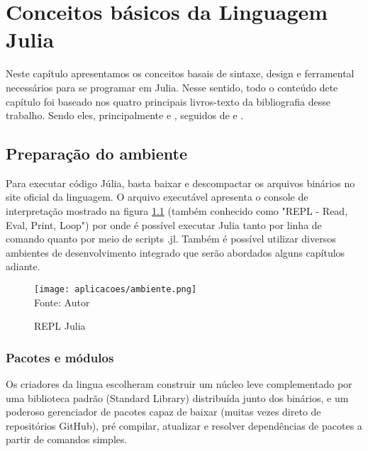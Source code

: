 %


\chapter{ Conceitos básicos da Linguagem Julia}


Neste capítulo apresentamos os conceitos basais de sintaxe, design e ferramental necessários para se programar em Julia. Nesse sentido, todo o conteúdo dete capítulo foi baseado nos quatro principais livros-texto da bibliografia desse trabalho. Sendo eles, principalmente \cite{Lobianco2019} e \cite{Balbaert2016}, seguidos de \cite{Lauwens2019} e \cite{Kwong2020}.

\section{Preparação do ambiente}
Para executar código Júlia, basta baixar e descompactar os arquivos binários no site oficial da linguagem. O arquivo executável apresenta o console de interpretação mostrado na figura \ref{REPL} (também conhecido como "REPL - Read, Eval, Print, Loop") por onde é possível executar Julia tanto por linha de comando quanto por meio de scripts .jl. Também é possível utilizar diversos ambientes de desenvolvimento integrado que serão abordados alguns capítulos adiante.
\begin{figure}[H]
\begin{center}
    \caption{REPL Julia} \label{REPL}
    \texttt{[image: aplicacoes/ambiente.png]} \\
    {\tiny \sf Fonte: Autor}
\end{center}
\end{figure} 

\subsection{Pacotes e módulos}

Os criadores da lingua escolheram construir um núcleo leve complementado por uma biblioteca padrão (Standard Library) distribuída junto dos binários, e um poderoso gerenciador de pacotes capaz de baixar (muitas vezes direto de repositórios GitHub), pré compilar, atualizar e resolver dependências de pacotes a partir de comandos simples. 

